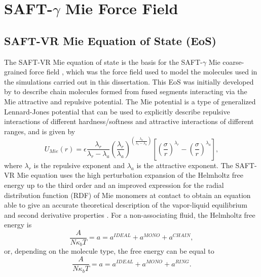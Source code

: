 \section{SAFT-$\gamma$ Mie Force Field}


\subsection{SAFT-VR Mie Equation of State (EoS)}

The SAFT-VR Mie equation of state \cite{lafitte2013} is the basis for the SAFT-$\gamma$ Mie coarse-grained force field \cite{avendano2011}, which was the force field used to model the molecules used in the simulations carried out in this dissertation. This EoS was initially developed by  to describe chain molecules formed from fused segments interacting via the Mie attractive and repulsive potential. The Mie potential is a type of generalized Lennard-Jones potential that can be used to explicitly describe repulsive interactions of different hardness/softness and attractive interactions of different ranges, and is given by
\begin{equation}
U_{Mie}(r) = \epsilon\frac{\lambda_r}{\lambda_r - \lambda_a} \left(\frac{\lambda_r}{\lambda_a} \right)^{\left( \frac{\lambda_a}{\lambda_r - \lambda_a} \right)}
\left[ \left(\frac{\sigma}{r} \right)^{\lambda_r} - \left(\frac{\sigma}{r} \right)^{\lambda_a} \right],
\label{eqn:miepotential}
\end{equation}
where $\lambda_r$ is the repulsive exponent and $\lambda_a$ is the attractive exponent. The SAFT-VR Mie equation uses the  high perturbation expansion of the Helmholtz free energy up to the third order and an improved expression for the  radial distribution function (RDF) of Mie monomers at contact to obtain an equation able to give an accurate theoretical description of the vapor-liquid equilibrium and second derivative properties \cite{lafitte2013}. For a non-associating fluid, the Helmholtz free energy is
\begin{equation}
\frac{A}{N\kappa_{b}T} = a = a^{IDEAL} + a^{MONO} + a^{CHAIN}, 
\label{eqn:miehelm}
\end{equation}
or, depending on the molecule type, the free energy can be equal to
\begin{equation}
\frac{A}{N\kappa_{b}T} = a = a^{IDEAL} + a^{MONO} + a^{RING}.
\label{eqn:miehelmring}
\end{equation}

